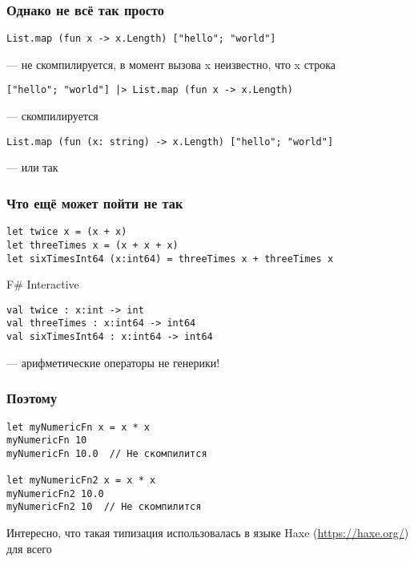 \documentclass[xetex,mathserif,serif]{beamer}
\begin{document}
    \begin{frame}[fragile]
        \frametitle{Однако не всё так просто}
        \begin{verbatim}
List.map (fun x -> x.Length) ["hello"; "world"]
        \end{verbatim}
        --- не скомпилируется, в момент вызова x неизвестно, что x строка
        \vspace{1cm}
        \begin{verbatim}
["hello"; "world"] |> List.map (fun x -> x.Length)  
        \end{verbatim}
        --- скомпилируется
        \vspace{1cm}
        \begin{verbatim}
List.map (fun (x: string) -> x.Length) ["hello"; "world"] 
        \end{verbatim}
        --- или так
    \end{frame}

    \begin{frame}[fragile]
        \frametitle{Что ещё может пойти не так}
        \begin{verbatim}
let twice x = (x + x)
let threeTimes x = (x + x + x)
let sixTimesInt64 (x:int64) = threeTimes x + threeTimes x
        \end{verbatim}
        \vspace{1cm}
        \begin{alertblock}{F\# Interactive}
            \begin{verbatim}
val twice : x:int -> int
val threeTimes : x:int64 -> int64
val sixTimesInt64 : x:int64 -> int64
            \end{verbatim}
        \end{alertblock}
        --- арифметические операторы не генерики!
    \end{frame}

    \begin{frame}[fragile]
        \frametitle{Поэтому}
        \begin{verbatim}
let myNumericFn x = x * x
myNumericFn 10
myNumericFn 10.0  // Не скомпилится

let myNumericFn2 x = x * x
myNumericFn2 10.0
myNumericFn2 10  // Не скомпилится
        \end{verbatim}
        \vspace{1cm}
        Интересно, что такая типизация использовалась в языке Haxe (\url{https://haxe.org/}) для всего
    \end{frame}
\end{document}
